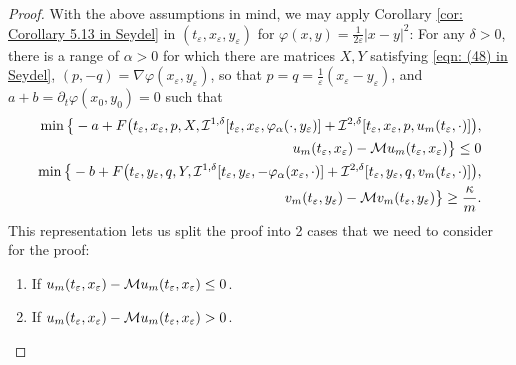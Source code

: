 \begin{proof}
    With the above assumptions in mind, we may apply Corollary \ref{cor: Corollary 5.13 in Seydel} in $(t_\varepsilon,x_\varepsilon,y_\varepsilon)$ for $\varphi(x,y) = \frac{1}{2\varepsilon} |x-y|^2$: For any $\delta > 0$, there is a range of $\alpha>0$ for which there are matrices $X,Y$ satisfying \eqref{eqn: (48) in Seydel}, $(p,-q) = \nabla \varphi(x_\varepsilon,y_\varepsilon)$, so that $p=q=\frac{1}{\varepsilon}(x_\varepsilon - y_\varepsilon)$, and $a+b= \partial_t \varphi(x_0,y_0) = 0$ such that
    \begin{align*}
        \min \big\{-a + F\big(t_\varepsilon, x_\varepsilon, p, X, \mathcal{I}^{1,\delta}[t_\varepsilon,x_\varepsilon,\varphi_\alpha(\cdot,y_\varepsilon)] + \mathcal{I}^{2,\delta}[t_\varepsilon,x_\varepsilon,p,u_m(t_\varepsilon,\cdot)]\big), \\
        u_m(t_\varepsilon, x_\varepsilon) - \mathcal{M} u_m(t_\varepsilon,x_\varepsilon) \big\} \leq 0 \\
        \min \big\{-b + F\big(t_\varepsilon, y_\varepsilon, q, Y, \mathcal{I}^{1,\delta}[t_\varepsilon,y_\varepsilon,-\varphi_\alpha(x_\varepsilon, \cdot)] + \mathcal{I}^{2,\delta}[t_\varepsilon,y_\varepsilon,q,v_m(t_\varepsilon,\cdot)]\big), \\
        v_m(t_\varepsilon, y_\varepsilon) - \mathcal{M} v_m(t_\varepsilon,y_\varepsilon) \big\} \geq \frac{\kappa}{m}.
    \end{align*}
    This representation lets us split the proof into 2 cases that we need to consider for the proof: 
    \begin{enumerate}[label=\textbf{Case 2\alph*:}, leftmargin=*, labelsep=.6em]
        \item If $u_m(t_\varepsilon,x_\varepsilon) - \mathcal{M} u_m(t_\varepsilon,x_\varepsilon) \leq 0$.
        \item If $u_m(t_\varepsilon,x_\varepsilon) - \mathcal{M} u_m(t_\varepsilon,x_\varepsilon) > 0$.
    \end{enumerate}


\end{proof}
